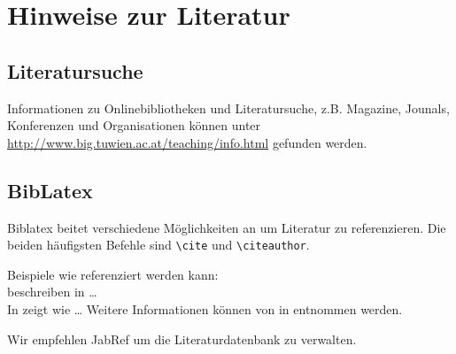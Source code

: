 \chapter{Hinweise zur Literatur}
\label{sec:references}

\section{Literatursuche}

Informationen zu Onlinebibliotheken und Literatursuche, z.B. Magazine, Jounals, Konferenzen und Organisationen können unter \url{http://www.big.tuwien.ac.at/teaching/info.html} gefunden werden.

\section{BibLatex}

Biblatex beitet verschiedene Möglichkeiten an um Literatur zu referenzieren. Die beiden häufigsten Befehle sind \verb|\cite| und \verb|\citeauthor|.

Beispiele wie referenziert werden kann:\\
\citeauthor{fankhauser:2009:softwaretechnik-security} beschreiben in \cite{fankhauser:2009:softwaretechnik-security} \dots\\
In \cite{schanes:2011:voip-fuzzer} zeigt \citeauthor{schanes:2011:voip-fuzzer} wie \dots
Weitere Informationen können von \cite{oasis:2010:homepage} in \cite{oasis:2010:homepage} entnommen werden.

Wir empfehlen JabRef um die Literaturdatenbank zu verwalten.

% 
% 
% 
% 
% 
